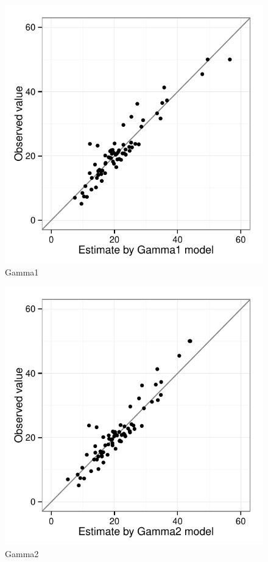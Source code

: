 \documentclass[10pt, letterpaper ]{article}
\begin{document}
\begin{minipage}{0.49\textwidth}
\begin{figure}[H]
	\centering
	\includegraphics[width=\textwidth]{figures/gamma1.pdf}
	\caption{Gamma1}
\end{figure}
\end{minipage}
\begin{minipage}{0.49\textwidth}
	\begin{figure}[H]
		\centering
	\includegraphics[width=\textwidth]{figures/gamma2.pdf}
	\caption{Gamma2}
	\end{figure}
\end{minipage}
\end{document}

